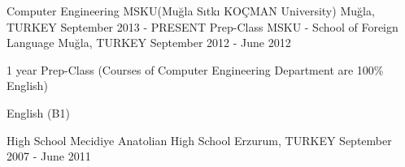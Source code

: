 \begin{cventries}
  \cventry
    {Computer Engineering}
    {MSKU(Muğla Sıtkı KOÇMAN University)}
    {Muğla, TURKEY}
    {September 2013 - PRESENT}
    {
    }
  \cventry
    {Prep-Class}
    {MSKU - School of Foreign Language }
    {Muğla, TURKEY}
    {September 2012 - June 2012}
    {
        \begin {cvitems}
            \item {1 year Prep-Class (Courses of Computer Engineering Department are 100\% English)}
            \item {English (B1)}
        \end {cvitems}
    }
  \cventry
    {High School}
    {Mecidiye Anatolian High School}
    {Erzurum, TURKEY}
    {September 2007 - June 2011}
    {
    }

\end{cventries}
